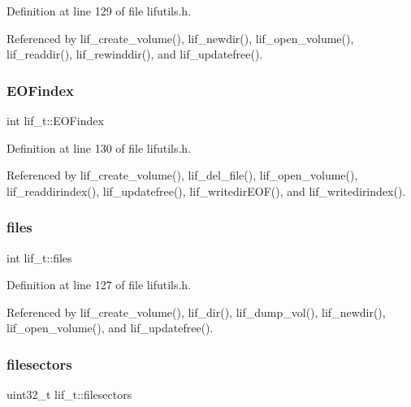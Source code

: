 Definition at line 129 of file lifutils.\+h.



Referenced by lif\+\_\+create\+\_\+volume(), lif\+\_\+newdir(), lif\+\_\+open\+\_\+volume(), lif\+\_\+readdir(), lif\+\_\+rewinddir(), and lif\+\_\+updatefree().

\mbox{\label{structlif__t_a68c465a879c7d4bd2279682185b6250e}} 
\subsubsection{\texorpdfstring{E\+O\+Findex}{EOFindex}}
{\footnotesize\ttfamily int lif\+\_\+t\+::\+E\+O\+Findex}



Definition at line 130 of file lifutils.\+h.



Referenced by lif\+\_\+create\+\_\+volume(), lif\+\_\+del\+\_\+file(), lif\+\_\+open\+\_\+volume(), lif\+\_\+readdirindex(), lif\+\_\+updatefree(), lif\+\_\+writedir\+E\+O\+F(), and lif\+\_\+writedirindex().

\mbox{\label{structlif__t_aceca398e2e3f6bcffe1593969544d546}} 
\subsubsection{\texorpdfstring{files}{files}}
{\footnotesize\ttfamily int lif\+\_\+t\+::files}



Definition at line 127 of file lifutils.\+h.



Referenced by lif\+\_\+create\+\_\+volume(), lif\+\_\+dir(), lif\+\_\+dump\+\_\+vol(), lif\+\_\+newdir(), lif\+\_\+open\+\_\+volume(), and lif\+\_\+updatefree().

\mbox{\label{structlif__t_a1223702cce63f879654d51773243643d}} 
\subsubsection{\texorpdfstring{filesectors}{filesectors}}
{\footnotesize\ttfamily uint32\+\_\+t lif\+\_\+t\+::filesectors}



